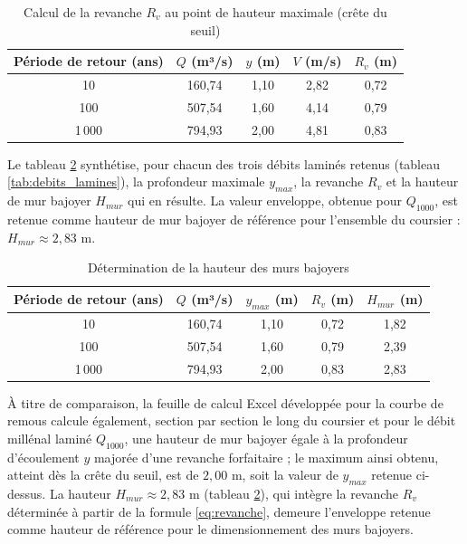 \begin{table}[H]
    \centering
    \caption{Calcul de la revanche $R_v$ au point de hauteur maximale (crête du seuil)}
    \label{tab:revanche}
    \begin{tabular}{|c|c|c|c|c|}
        \hline
        \textbf{Période de retour (ans)} & \textbf{$Q$ (m³/s)} & \textbf{$y$ (m)} & \textbf{$V$ (m/s)} & \textbf{$R_v$ (m)} \\
        \hline
        10 & 160,74 & 1,10 & 2,82 & 0,72 \\
        \hline
        100 & 507,54 & 1,60 & 4,14 & 0,79 \\
        \hline
        1\,000 & 794,93 & 2,00 & 4,81 & 0,83 \\
        \hline
    \end{tabular}
\end{table}

Le tableau \ref{tab:hauteur_murs} synthétise, pour chacun des trois débits laminés retenus (tableau \ref{tab:debits_lamines}), la profondeur maximale $y_{max}$, la revanche $R_v$ et la hauteur de mur bajoyer $H_{mur}$ qui en résulte. La valeur enveloppe, obtenue pour $Q_{1000}$, est retenue comme hauteur de mur bajoyer de référence pour l'ensemble du coursier : $H_{mur} \approx 2{,}83$ m.

\begin{table}[H]
    \centering
    \caption{Détermination de la hauteur des murs bajoyers}
    \label{tab:hauteur_murs}
    \begin{tabular}{|c|c|c|c|c|}
        \hline
        \textbf{Période de retour (ans)} & \textbf{$Q$ (m³/s)} & \textbf{$y_{max}$ (m)} & \textbf{$R_v$ (m)} & \textbf{$H_{mur}$ (m)} \\
        \hline
        10 & 160,74 & 1,10 & 0,72 & 1,82 \\
        \hline
        100 & 507,54 & 1,60 & 0,79 & 2,39 \\
        \hline
        1\,000 & 794,93 & 2,00 & 0,83 & 2,83 \\
        \hline
    \end{tabular}
\end{table}

À titre de comparaison, la feuille de calcul Excel développée pour la courbe de remous calcule également, section par section le long du coursier et pour le débit millénal laminé $Q_{1000}$, une hauteur de mur bajoyer égale à la profondeur d'écoulement $y$ majorée d'une revanche forfaitaire ; le maximum ainsi obtenu, atteint dès la crête du seuil, est de $2{,}00$ m, soit la valeur de $y_{max}$ retenue ci-dessus. La hauteur $H_{mur} \approx 2{,}83$ m (tableau \ref{tab:hauteur_murs}), qui intègre la revanche $R_v$ déterminée à partir de la formule \ref{eq:revanche}, demeure l'enveloppe retenue comme hauteur de référence pour le dimensionnement des murs bajoyers.

